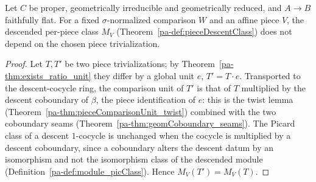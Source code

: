 \begin{theorem}
  \label{pa-thm:pieceDescentClass_congr}
  \leanok

  Let \(C\) be proper, geometrically irreducible and geometrically reduced, and \(A \to B\)
  faithfully flat. For a fixed \(\sigma\)-normalized comparison \(W\) and an affine piece \(V\), the
  descended per-piece class \(M_V\) (Theorem~\ref{pa-def:pieceDescentClass}) does not depend on the
  chosen piece trivialization.
\end{theorem}
\begin{proof}
  \leanok
  Let \(T, T'\) be two piece trivializations; by Theorem~\ref{pa-thm:exists_ratio_unit} they differ by a
  global unit \(e\), \(T' = T \cdot e\). Transported to the descent-cocycle ring, the comparison unit
  of \(T'\) is that of \(T\) multiplied by the descent coboundary of \(\beta\), the piece
  identification of \(e\): this is the twist lemma (Theorem~\ref{pa-thm:pieceComparisonUnit_twist})
  combined with the two coboundary seams (Theorem~\ref{pa-thm:geomCoboundary_seams}). The Picard class
  of a descent \(1\)-cocycle is unchanged when the cocycle is multiplied by a descent coboundary,
  since a coboundary alters the descent datum by an isomorphism and not the isomorphism class of the
  descended module (Definition~\ref{pa-def:module_picClass}). Hence \(M_V(T') = M_V(T)\).
\end{proof}

